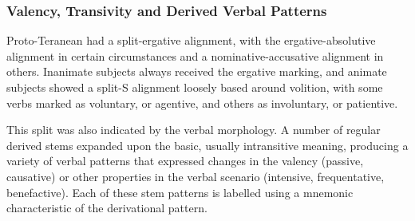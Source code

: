 \documentclass[grammar]{subfiles}
\begin{document}
\subsubsection{Valency, Transivity and Derived Verbal Patterns}
\label{sssec:history:pt:vm:valency_transivity_verbal_patterns}

Proto-Teranean had a split-ergative alignment, with the ergative-absolutive
alignment in certain circumstances and a nominative-accusative alignment in
others.  Inanimate subjects always received the ergative marking, and animate
subjects showed a split-S alignment loosely based around volition, with some
verbs marked as voluntary, or agentive, and others as involuntary, or
patientive.  

This split was also indicated by the verbal morphology. 
A number of regular derived stems expanded upon the basic, usually
intransitive meaning, producing a variety of verbal patterns that expressed
changes in the valency (passive, causative) or other properties in the verbal
scenario (intensive, frequentative, benefactive).  Each of these stem patterns
is labelled using a mnemonic characteristic of the derivational pattern.
\end{document}
